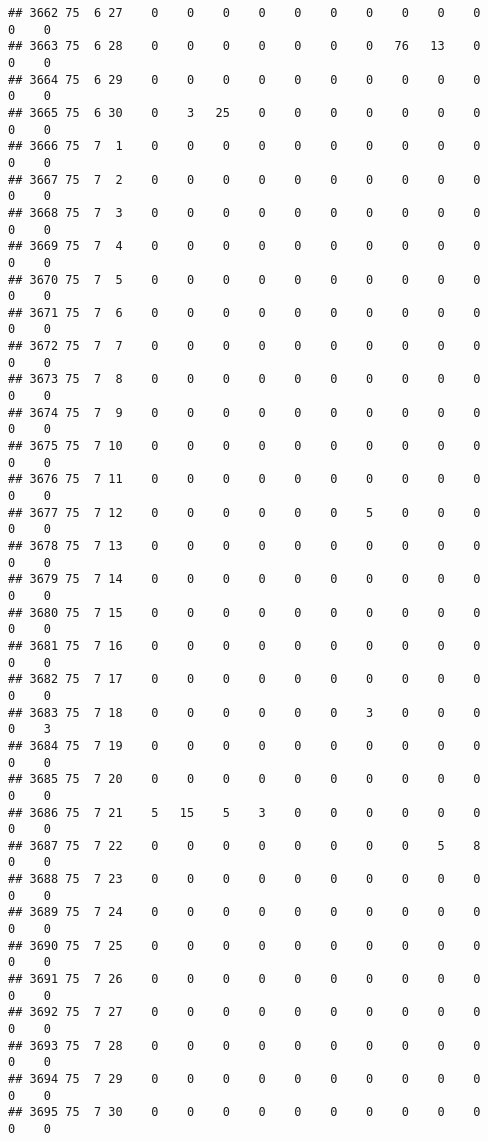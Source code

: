\documentclass[]{article}
\begin{document}
\begin{verbatim}
## 3662 75  6 27    0    0    0    0    0    0    0    0    0    0    0    0
## 3663 75  6 28    0    0    0    0    0    0    0   76   13    0    0    0
## 3664 75  6 29    0    0    0    0    0    0    0    0    0    0    0    0
## 3665 75  6 30    0    3   25    0    0    0    0    0    0    0    0    0
## 3666 75  7  1    0    0    0    0    0    0    0    0    0    0    0    0
## 3667 75  7  2    0    0    0    0    0    0    0    0    0    0    0    0
## 3668 75  7  3    0    0    0    0    0    0    0    0    0    0    0    0
## 3669 75  7  4    0    0    0    0    0    0    0    0    0    0    0    0
## 3670 75  7  5    0    0    0    0    0    0    0    0    0    0    0    0
## 3671 75  7  6    0    0    0    0    0    0    0    0    0    0    0    0
## 3672 75  7  7    0    0    0    0    0    0    0    0    0    0    0    0
## 3673 75  7  8    0    0    0    0    0    0    0    0    0    0    0    0
## 3674 75  7  9    0    0    0    0    0    0    0    0    0    0    0    0
## 3675 75  7 10    0    0    0    0    0    0    0    0    0    0    0    0
## 3676 75  7 11    0    0    0    0    0    0    0    0    0    0    0    0
## 3677 75  7 12    0    0    0    0    0    0    5    0    0    0    0    0
## 3678 75  7 13    0    0    0    0    0    0    0    0    0    0    0    0
## 3679 75  7 14    0    0    0    0    0    0    0    0    0    0    0    0
## 3680 75  7 15    0    0    0    0    0    0    0    0    0    0    0    0
## 3681 75  7 16    0    0    0    0    0    0    0    0    0    0    0    0
## 3682 75  7 17    0    0    0    0    0    0    0    0    0    0    0    0
## 3683 75  7 18    0    0    0    0    0    0    3    0    0    0    0    3
## 3684 75  7 19    0    0    0    0    0    0    0    0    0    0    0    0
## 3685 75  7 20    0    0    0    0    0    0    0    0    0    0    0    0
## 3686 75  7 21    5   15    5    3    0    0    0    0    0    0    0    0
## 3687 75  7 22    0    0    0    0    0    0    0    0    5    8    0    0
## 3688 75  7 23    0    0    0    0    0    0    0    0    0    0    0    0
## 3689 75  7 24    0    0    0    0    0    0    0    0    0    0    0    0
## 3690 75  7 25    0    0    0    0    0    0    0    0    0    0    0    0
## 3691 75  7 26    0    0    0    0    0    0    0    0    0    0    0    0
## 3692 75  7 27    0    0    0    0    0    0    0    0    0    0    0    0
## 3693 75  7 28    0    0    0    0    0    0    0    0    0    0    0    0
## 3694 75  7 29    0    0    0    0    0    0    0    0    0    0    0    0
## 3695 75  7 30    0    0    0    0    0    0    0    0    0    0    0    0

\end{verbatim}
\end{document}
